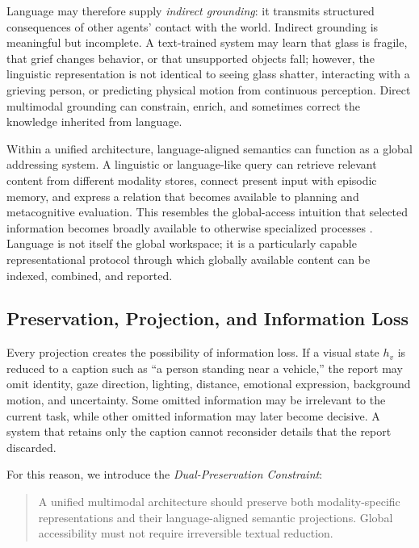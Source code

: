 Language may therefore supply \emph{indirect grounding}: it transmits structured consequences of other agents' contact with the world. Indirect grounding is meaningful but incomplete. A text-trained system may learn that glass is fragile, that grief changes behavior, or that unsupported objects fall; however, the linguistic representation is not identical to seeing glass shatter, interacting with a grieving person, or predicting physical motion from continuous perception. Direct multimodal grounding can constrain, enrich, and sometimes correct the knowledge inherited from language.

Within a unified architecture, language-aligned semantics can function as a global addressing system. A linguistic or language-like query can retrieve relevant content from different modality stores, connect present input with episodic memory, and express a relation that becomes available to planning and metacognitive evaluation. This resembles the global-access intuition that selected information becomes broadly available to otherwise specialized processes \cite{baars1988cognitive,dehaene2011experimental,mashour2020conscious}. Language is not itself the global workspace; it is a particularly capable representational protocol through which globally available content can be indexed, combined, and reported.

\subsection{Preservation, Projection, and Information Loss}
\label{subsec:preservation-projection-loss}

Every projection creates the possibility of information loss. If a visual state $h_v$ is reduced to a caption such as ``a person standing near a vehicle,'' the report may omit identity, gaze direction, lighting, distance, emotional expression, background motion, and uncertainty. Some omitted information may be irrelevant to the current task, while other omitted information may later become decisive. A system that retains only the caption cannot reconsider details that the report discarded.

For this reason, we introduce the \emph{Dual-Preservation Constraint}:

\begin{quote}
A unified multimodal architecture should preserve both modality-specific representations and their language-aligned semantic projections. Global accessibility must not require irreversible textual reduction.
\end{quote}

